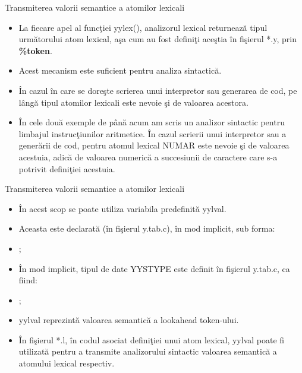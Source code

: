 \documentclass[pdf]{beamer}
\begin{document}
\begin{frame}{Transmiterea valorii semantice a atomilor lexicali}
\begin{itemize}
	\item
	La fiecare apel al funcţiei yylex(), analizorul lexical returnează tipul următorului atom lexical, aşa cum au fost definiţi aceştia în fişierul *.y, prin \textbf{\%token}.

	\item
	Acest mecanism este suficient pentru analiza sintactică.

	\item
	În cazul în care se doreşte scrierea unui interpretor sau generarea de cod, pe lângă tipul atomilor lexicali este nevoie şi de valoarea acestora.

	\item
	În cele două exemple de până acum am scris un analizor sintactic pentru limbajul instrucţiunilor aritmetice. În cazul scrierii unui interpretor sau a generării de cod, pentru atomul lexical NUMAR este nevoie şi de valoarea acestuia, adică de valoarea numerică a succesiunii de caractere care s-a potrivit definiţiei acestuia.

\end{itemize}
\end{frame}



\begin{frame}{Transmiterea valorii semantice a atomilor lexicali}
\begin{itemize}
	\item
	În acest scop se poate utiliza variabila predefinită {\color{red}yylval}.

	\item
	Aceasta este declarată (în fişierul y.tab.c), în mod implicit, sub forma:
	
	\item[]
	;

	\item
	În mod implicit, tipul de date YYSTYPE este definit în fişierul y.tab.c, ca fiind:
	
	\item[]
	;

	\item
	yylval reprezintă valoarea semantică a lookahead token-ului. 

	\item
	În fişierul *.l, în codul asociat definiţiei unui atom lexical, yylval poate fi utilizată pentru a transmite analizorului sintactic valoarea semantică a atomului lexical respectiv.

\end{itemize}
\end{frame}
\end{document}
